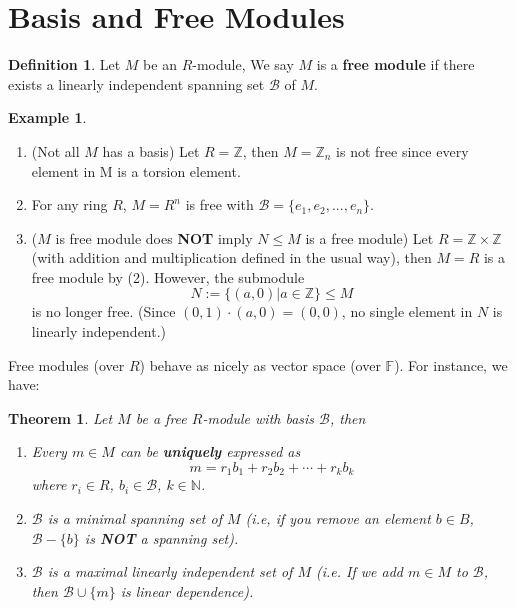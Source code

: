 \documentclass[11pt,openany]{book}
\theoremstyle{plain}
\newtheorem{theorem}{Theorem}[chapter]
\theoremstyle{definition}
\newtheorem{definition}[definition]{Definition}
\newtheorem{example}[example]{Example}
\theoremstyle{remark}
\begin{document}
\section{Basis and Free Modules}

\begin{definition}
    Let $M$ be an $R$-module, We say $M$ is a {\bf free module} if there exists a linearly independent spanning set $\mathcal{B}$ of $M$.
\end{definition}

\begin{example}\
    \begin{enumerate}
        \item (Not all $M$ has a basis) Let $R=\mathbb{Z}$, then $M=\mathbb{Z}_n$ is not free since every element in M is a torsion element.
        \item For any ring $R$, $M = R^n$ is free with $\mathcal{B}=\{e_1,e_2,...,e_n\}$.
        \item ($M$ is free module does {\bf NOT} imply $N\leq M$ is a free module) Let $R=\mathbb{Z}\times \mathbb{Z}$ (with addition and multiplication defined in the usual way), then $M=R$ is a free module by (2). However, the submodule
        $$N:= \{(a,0)| a\in \mathbb{Z}\} \leq M$$
        is no longer free. (Since $(0,1)\cdot (a,0)= (0,0)$, no single element in $N$ is linearly independent.)
        
    \end{enumerate}
\end{example}

Free modules (over $R$) behave as nicely as vector space (over $\mathbb{F}$). For instance, we have:

\begin{theorem}
    Let $M$ be a free $R$-module with basis $\mathcal{B}$, then 
    \begin{enumerate}
        \item Every $m\in M$ can be {\bf uniquely} expressed as $$m=r_1b_1+r_2b_2+\cdots+ r_kb_k$$ where $r_i\in R$, $b_i\in \mathcal{B}$, $k\in \mathbb{N}$.
        \item $\mathcal{B}$ is a minimal spanning set of $M$ (i.e, if you remove an element $b\in B$, $\mathcal{B} - \{b\}$ is {\bf NOT} a spanning set).
        \item $\mathcal{B}$ is a maximal linearly independent set of $M$ (i.e. If we add $m\in M$ to $\mathcal{B}$, then $\mathcal{B}\cup \{m\}$ is linear dependence).
    \end{enumerate}
\end{theorem}
\end{document}
